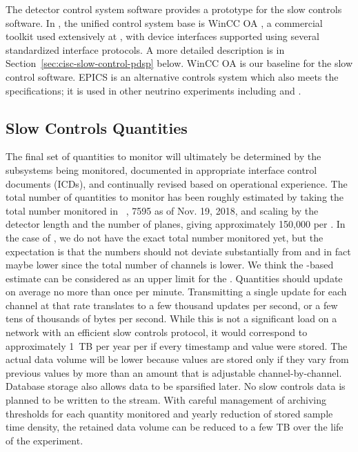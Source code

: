 The  detector control system software \cite{pdspdcs_proc}
provides a prototype for %
the  slow controls software.
In , the unified control system base is WinCC OA \cite{winccoa}, a
commercial toolkit used extensively at , with device interfaces
supported using several standardized interface protocols. A more detailed description is in Section~\ref{sec:cisc-slow-control-pdsp} below.
WinCC OA is our baseline for the  slow control software.
EPICS \cite{epics7} is an alternative controls system which also meets the specifications; it is used in other neutrino experiments including \cite{microboone} and \cite{Lukhanin:2012fp}. 

\subsection{Slow Controls Quantities}
\label{sec:fdgen-slow-cryo-quant}



The final set of quantities to monitor will ultimately be determined
by the subsystems being monitored, documented in appropriate  interface control documents (ICDs), and continually revised based on operational experience.  The total number of quantities to monitor has been roughly estimated by taking the total number monitored in ~\cite{pdspdcs_proc}, 7595 as of Nov. 19, 2018, and scaling by the detector length and the number of planes, giving approximately 150,000 per . In the case of , we do not have the exact total number monitored yet, but the expectation is that the  numbers should not deviate substantially from  and in fact maybe lower since the total number of channels is lower. We think the -based estimate can be considered as an upper limit for the .
Quantities should update on average no more than once per minute.
Transmitting a single update for each channel at that rate translates to a few thousand updates per second, or a few tens of thousands of bytes per second. While this is not a significant load on a network with an efficient slow controls protocol, it would correspond to approximately \SI{1}{TB} per year per  if every timestamp and value were stored.
The actual data volume will be lower because values are stored only if they vary from previous values by more than an amount that is adjustable channel-by-channel.
Database storage also allows data to be sparsified later.
No slow controls data is planned to be written to the  stream.
With careful management of archiving thresholds for each quantity monitored and yearly reduction of stored sample time density, the retained data volume can be reduced to a few TB over the life of the experiment.

